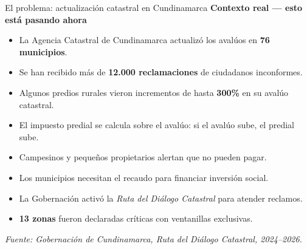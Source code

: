 \documentclass[aspectratio=169]{beamer}
\begin{document}
\begin{frame}{El problema: actualización catastral en Cundinamarca}
  {\color{accent}\textbf{Contexto real --- esto está pasando ahora}}
  \vspace{0.4em}

  \small
  \begin{itemize}\itemsep2pt
    \item La Agencia Catastral de Cundinamarca actualizó los avalúos en
    \textbf{76 municipios}.
    \item Se han recibido más de \textbf{12.000 reclamaciones} de
    ciudadanos inconformes.
    \item Algunos predios rurales vieron incrementos de hasta \textbf{300\%}
    en su avalúo catastral.
    \item El impuesto predial se calcula sobre el avalúo: si el avalúo
    sube, el predial sube.
    \item Campesinos y pequeños propietarios alertan que no pueden pagar.
    \item Los municipios necesitan el recaudo para financiar inversión
    social.
    \item La Gobernación activó la \textit{Ruta del Diálogo Catastral}
    para atender reclamos.
    \item \textbf{13 zonas} fueron declaradas críticas con ventanillas
    exclusivas.
  \end{itemize}
  \vspace{0.3em}
  {\scriptsize \textit{Fuente: Gobernación de Cundinamarca, Ruta del
  Diálogo Catastral, 2024--2026.}}
\end{frame}
\end{document}
